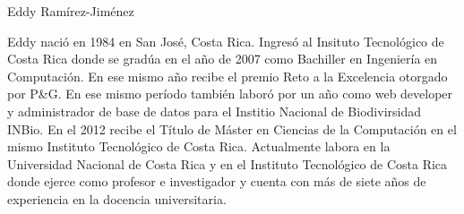 \documentclass[12pt,journal,compsoc]{IEEEtran}
\begin{document}

%
%
%

% 

\begin{IEEEbiography}{Eddy Ram\'irez-Jim\'enez}

Eddy naci\'o en 1984 en San Jos\'e, Costa Rica. Ingresó al Insituto Tecnológico de Costa Rica donde se grad\'ua en el a\~no de 2007 como Bachiller en Ingenier\'ia en Computaci\'on. En ese mismo a\~no recibe el premio Reto a la Excelencia otorgado por P\&G. En ese mismo per\'iodo tambi\'en labor\'o por un a\~no como web developer y administrador de base de datos para el Institio Nacional de Biodivirsidad INBio. En el 2012 recibe el Título de M\'aster en Ciencias de la Computaci\'on en el mismo Instituto Tecnol\'ogico de Costa Rica.
Actualmente labora en la Universidad Nacional de Costa Rica y en el Instituto Tecnol\'ogico de Costa Rica donde ejerce como profesor e investigador y cuenta con m\'as de siete a\~nos de experiencia en la docencia universitaria. 

\end{IEEEbiography}
\end{document}
